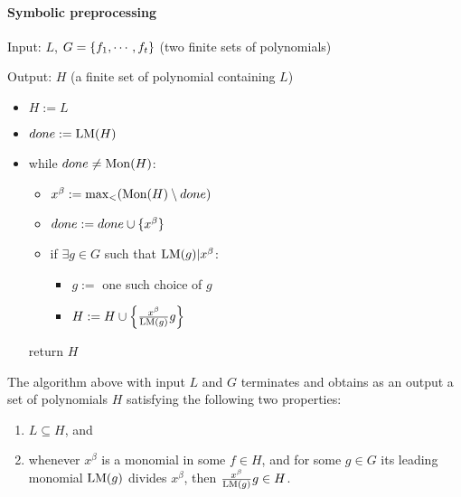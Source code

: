 \begin{htmlonly}
    \paragraph{Symbolic preprocessing}

    Input: $L$, $G = \{ f_1, \cdots, f_t \}$
    (two finite sets of polynomials)

    Output: $H$ (a finite set of polynomial containing $L$)

    \begin{itemize}
        \item $H := L$
        \item $done := \mathrm{LM}(H)$
        \item while $done \ne \mathrm{Mon}(H)$:
        \begin{itemize}
            \item $x^\beta := \max_{<} (\mathrm{Mon}(H) \setminus done)$
            \item $done := done \cup \{ x^\beta \}$
            \item if $\exists g \in G$ such that $\mathrm{LM}(g) | x^\beta$:
                \begin{itemize}
                    \item $g :=$ one such choice of $g$
                    \item $H := H \cup \left\{ \frac{x^\beta}{\mathrm{LM}(g)} g \right\}$
                \end{itemize}
        \end{itemize}
        return $H$
    \end{itemize}
\end{htmlonly}

\begin{theorem}
    The algorithm above with input \(L\) and \(G\) terminates and obtains as an
    output a set of polynomials \(H\) satisfying the following two properties:
    \begin{enumerate}[label=\textbf{(\roman*)}]
        \item \(L \subseteq H\), and
        \item whenever \(x^\beta\) is a monomial in some \(f \in H\), and for
        some \(g \in G\) its leading monomial \(\mathrm{LM}(g)\) divides
        \(x^\beta\), then \(\frac{x^\beta}{\mathrm{LM}(g)} g \in H\).
    \end{enumerate}
\end{theorem}


